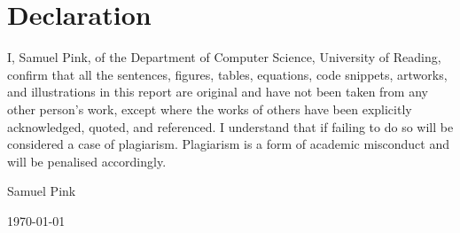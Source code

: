 \documentclass[a4paper,11pt,oneside]{book}
\begin{document}
    \newpage
    \thispagestyle{empty}
    \chapter*{\Large Declaration}
    I, Samuel Pink, of the Department of Computer Science, University of Reading, confirm that all the sentences, figures, tables, equations, code snippets, artworks, and illustrations in this report are original and have not been taken from any other person's work, except where the works of others have been explicitly acknowledged, quoted, and referenced. I understand that if failing to do so will be considered a case of plagiarism. Plagiarism is a form of academic misconduct and will be penalised accordingly.\\[1cm]
    
    
    \begin{flushright}
        Samuel Pink %
        
        \today
    \end{flushright}
     
    
    
   
    
    
    \tableofcontents
    
    \mainmatter
    
\end{document}
